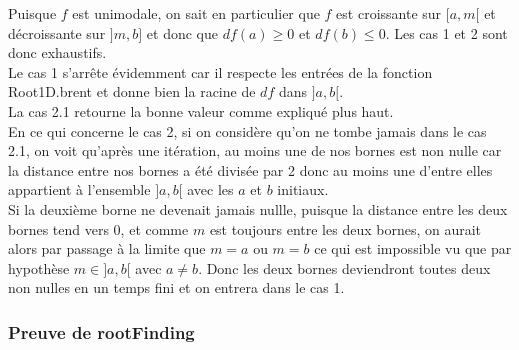 \documentclass[a4paper, 12pt]{article}
\begin{document}
Puisque \( f \) est unimodale, on sait en particulier que \( f \) est croissante sur \( [a, m[ \) et décroissante sur \( ]m, b] \) et donc que \( df(a) \geq 0 \) et \( df(b) \leq 0 \). Les cas 1 et 2 sont donc exhaustifs. \\
Le cas 1 s'arrête évidemment car il respecte les entrées de la fonction Root1D.brent et donne bien la racine de \( df \) dans \( ]a, b[ \). \\
La cas 2.1 retourne la bonne valeur comme expliqué plus haut. \\
En ce qui concerne le cas 2, si on considère qu'on ne tombe jamais dans le cas 2.1, on voit qu'après une itération, au moins une de nos bornes est non nulle car la distance entre nos bornes a été divisée par 2 donc au moins une d'entre elles appartient à l'ensemble \( ]a, b[ \) avec les \( a \) et \( b \) initiaux. \\
Si la deuxième borne ne devenait jamais nullle, puisque la distance entre les deux bornes tend vers 0, et comme \( m \) est toujours entre les deux bornes, on aurait alors par passage à la limite que \( m = a \) ou \( m = b \) ce qui est impossible vu que par hypothèse \( m \in ]a, b[ \) avec \( a \neq b \).
Donc les deux bornes deviendront toutes deux non nulles en un temps fini et on entrera dans le cas 1.

\newpage

\subsubsection{Preuve de rootFinding}
\end{document}

